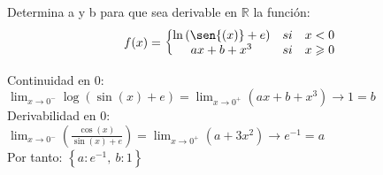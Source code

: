 \documentclass[addpoints,spanish, 12pt,a4paper]{exam}
\begin{document}
\begin{questions}
\addpoints


\question[4] Determina a y b para que sea derivable en $\mathbb{R}$ la función: $$f(x)=\left\{\begin{matrix}
\ln{\left(\sen{\left(x \right)} + e \right)} & si & x<0 \\
a x + b + x^{3} & si & x\geqslant 0 \\
\end{matrix}\right.$$ 


\begin{solution}
Continuidad en 0:\\ $\lim_{x \to 0^-} \log{\left(\sin{\left(x \right)} + e \right)} = \lim_{x \to 0^+}\left(a x + b + x^{3}\right) \to 1 = b $ \\ Derivabilidad en 0: \\ $\lim_{x \to 0^-}\left(\frac{\cos{\left(x \right)}}{\sin{\left(x \right)} + e}\right) = \lim_{x \to 0^+}\left(a + 3 x^{2}\right) \to e^{-1} = a $ \\ Por tanto: $\left\{ a : e^{-1}, \  b : 1\right\} $ \\ 
\end{solution}


\end{questions}
\end{document}
